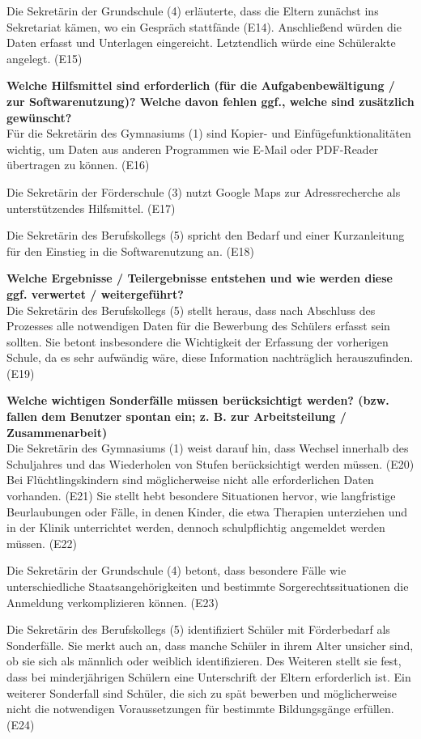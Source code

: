 Die Sekretärin der Grundschule (4) erläuterte, dass die Eltern zunächst ins Sekretariat kämen, wo ein Gespräch stattfände (E14). Anschließend würden die Daten erfasst und Unterlagen eingereicht. Letztendlich würde eine Schülerakte angelegt. (E15)

\textbf{Welche Hilfsmittel sind erforderlich (für die Aufgabenbewältigung / zur Softwarenutzung)? Welche davon fehlen ggf., welche sind zusätzlich gewünscht?}\\
Für die Sekretärin des Gymnasiums (1) sind Kopier- und Einfügefunktionalitäten wichtig, um Daten aus anderen Programmen wie E-Mail oder PDF-Reader übertragen zu können. (E16)

Die Sekretärin der Förderschule (3) nutzt Google Maps zur Adressrecherche als unterstützendes Hilfsmittel. (E17)

Die Sekretärin des Berufskollegs (5) spricht den Bedarf und einer Kurzanleitung für den Einstieg in die Softwarenutzung an. (E18)

\textbf{Welche Ergebnisse / Teilergebnisse entstehen und wie werden diese ggf. verwertet / weitergeführt?}\\
Die Sekretärin des Berufskollegs (5) stellt heraus, dass nach Abschluss des Prozesses alle notwendigen Daten für die Bewerbung des Schülers erfasst sein sollten. Sie betont insbesondere die Wichtigkeit der Erfassung der vorherigen Schule, da es sehr aufwändig wäre, diese Information nachträglich herauszufinden.(E19) 

\textbf{Welche wichtigen Sonderfälle müssen berücksichtigt werden? (bzw. fallen dem Benutzer spontan ein; z. B. zur Arbeitsteilung / Zusammenarbeit)}\\
Die Sekretärin des Gymnasiums (1) weist darauf hin, dass Wechsel innerhalb des Schuljahres und das Wiederholen von Stufen berücksichtigt werden müssen. (E20) Bei Flüchtlingskindern sind möglicherweise nicht alle erforderlichen Daten vorhanden. (E21) Sie stellt hebt besondere Situationen hervor, wie langfristige Beurlaubungen oder Fälle, in denen Kinder, die etwa Therapien unterziehen und in der Klinik unterrichtet werden, dennoch schulpflichtig angemeldet werden müssen. (E22)

Die Sekretärin der Grundschule (4) betont, dass besondere Fälle wie unterschiedliche Staatsangehörigkeiten und bestimmte Sorgerechtssituationen die Anmeldung verkomplizieren können. (E23)

Die Sekretärin des Berufskollegs (5) identifiziert Schüler mit Förderbedarf als Sonderfälle. Sie merkt auch an, dass manche Schüler in ihrem Alter unsicher sind, ob sie sich als männlich oder weiblich identifizieren. Des Weiteren stellt sie fest, dass bei minderjährigen Schülern eine Unterschrift der Eltern erforderlich ist. Ein weiterer Sonderfall sind Schüler, die sich zu spät bewerben und möglicherweise nicht die notwendigen Voraussetzungen für bestimmte Bildungsgänge erfüllen. (E24)

